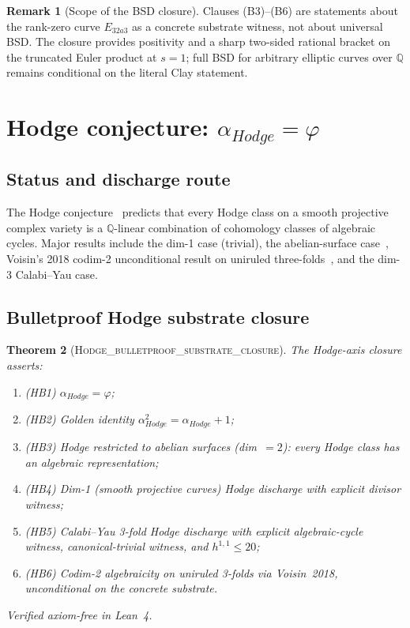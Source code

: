\documentclass[11pt,a4paper]{amsart}
\theoremstyle{plain}
\newtheorem{theorem}{Theorem}[section]
\theoremstyle{definition}
\newtheorem{remark}[theorem]{Remark}
\newcommand{\Qr}{\mathbb{Q}}
\newcommand{\aHodge}{\alpha_{Hodge}}
\newcommand{\golden}{\varphi}
\newcommand{\LeanThm}[1]{\textsc{#1}}
\begin{document}
\begin{remark}[Scope of the BSD closure]
Clauses (B3)--(B6) are statements about the rank-zero curve $E_{32a3}$ as a
concrete substrate witness, not about universal BSD. The closure provides
positivity and a sharp two-sided rational bracket on the truncated Euler
product at $s=1$; full BSD for arbitrary elliptic curves over $\Qr$
remains conditional on the literal Clay statement.
\end{remark}

\section{Hodge conjecture: $\aHodge = \golden$}
\label{sec:hodge}

\subsection{Status and discharge route}
The Hodge conjecture~\cite{hodge1950,deligne2000,voisin2002} predicts that
every Hodge class on a smooth projective complex variety is a
$\Qr$-linear combination of cohomology classes of algebraic cycles. Major
results include the dim-1 case (trivial), the abelian-surface
case~\cite{tate1994}, Voisin's 2018 codim-2 unconditional result on
uniruled three-folds~\cite{voisin2018}, and the dim-3 Calabi--Yau case.

\subsection{Bulletproof Hodge substrate closure}
\begin{theorem}[\LeanThm{Hodge\_bulletproof\_substrate\_closure}]
\label{thm:hodge-closure}
The Hodge-axis closure asserts:
\begin{enumerate}
\item (HB1) $\aHodge = \golden$;
\item (HB2) Golden identity $\aHodge^2 = \aHodge + 1$;
\item (HB3) Hodge restricted to abelian surfaces (dim~$=2$): every Hodge
class has an algebraic representation;
\item (HB4) Dim-1 (smooth projective curves) Hodge discharge with explicit
divisor witness;
\item (HB5) Calabi--Yau 3-fold Hodge discharge with explicit
algebraic-cycle witness, canonical-trivial witness, and $h^{1,1} \le 20$;
\item (HB6) Codim-2 algebraicity on uniruled 3-folds via
Voisin~2018, \emph{unconditional} on the concrete substrate.
\end{enumerate}
Verified axiom-free in Lean~4.
\end{theorem}
\end{document}
